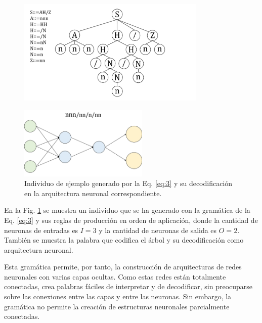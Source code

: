 \documentclass[spanish,a4paper,12pt,twoside]{report}
\begin{document}
      \begin{figure}[H]
        \centering
        \includegraphics[width = 0.8\textwidth]{resources/Fig14_1.pdf}
      \end{figure} \par
      \vspace{-1cm}
      \begin{figure}[H]
        \centering
        \includegraphics[width = 0.55\textwidth]{resources/Fig14_2.pdf}
        \caption{Individuo de ejemplo generado por la Eq. \ref{eq:3} y su decodificación en la arquitectura neuronal correspondiente.}
        \label{fig:14}
      \end{figure} \par
      En la Fig. \ref{fig:14} se muestra un individuo que se ha generado con la gramática de la Eq. \ref{eq:3} y sus reglas de producción en orden de aplicación, donde la cantidad de neuronas de entradas es $I = 3$ y la cantidad de neuronas de salida es $O = 2$. También se muestra la palabra que codifica el árbol y su decodificación como arquitectura neuronal. \par
      Esta gramática permite, por tanto, la construcción de arquitecturas de redes neuronales con varias capas ocultas. Como estas redes están totalmente conectadas, crea palabras fáciles de interpretar y de decodificar, sin preocuparse sobre las conexiones entre las capas y entre las neuronas. Sin embargo, la gramática no permite la creación de estructuras neuronales parcialmente conectadas. \par
\end{document}
